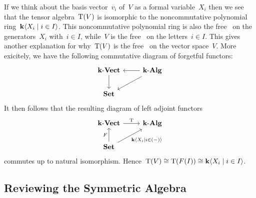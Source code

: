\begin{recall}
\begin{description}
      If we think about the basis vector~$v_i$ of~$V$ as a formal variable~$X_i$ then we see that the tensor algebra~$\operatorname{T}(V)$ is isomorphic to the noncommutative polynomial ring~$\kf\gen{X_i \suchthat i \in I}$.
      This noncommutative polynomial ring is also the free~{\algebra{$\kf$}} on the generators~$X_i$ with~$i \in I$, while~$V$ is the free~{\vectorspace{$\kf$}} on the letters~$i \in I$.
      This gives another explanation for why~$\operatorname{T}(V)$ is the free~{\algebra{$\kf$}} on the vector space~$V$.
      More exicitely, we have the following commutative diagram of forgetful functors:
      \[
        \begin{tikzcd}
          \cVect{\kf}
          \arrow{d}
          &
          \cAlg{\kf}
          \arrow{l}
          \arrow{dl}
          \\
          \cSet
          &
          {}
        \end{tikzcd}
      \]
      It then follows that the resulting diagram of left adjoint functors
      \[
        \begin{tikzcd}
          \cVect{\kf}
          \arrow{r}[above]{\Tensor}
          &
          \cAlg{\kf}
          \\
          \cSet
          \arrow{u}[left]{F}
          \arrow{ur}[below right]{\kf\gen{X_i \suchthat i \in (-)}}
          &
          {}
        \end{tikzcd}
      \]
      commutes up to natural isomorphism.
      Hence~$\Tensor(V) \cong \Tensor(F(I)) \cong \kf\gen{X_i \suchthat i \in I}$.
  \end{description}
\end{recall}





\subsection{Reviewing the Symmetric Algebra}


